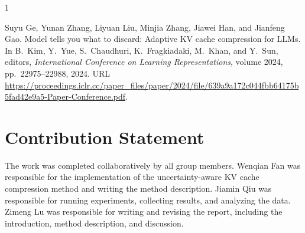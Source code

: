 \documentclass{article}
\begin{document}


\begin{thebibliography}{1}
\small

Suyu Ge, Yunan Zhang, Liyuan Liu, Minjia Zhang, Jiawei Han, and Jianfeng Gao.
\newblock Model tells you what to discard: Adaptive KV cache compression for LLMs.
\newblock In B.~Kim, Y.~Yue, S.~Chaudhuri, K.~Fragkiadaki, M.~Khan, and Y.~Sun, editors,
{\it International Conference on Learning Representations}, volume 2024,
pp.\ 22975--22988, 2024.
\newblock URL \url{https://proceedings.iclr.cc/paper_files/paper/2024/file/639a9a172c044fbb64175b5fad42e9a5-Paper-Conference.pdf}.

\end{thebibliography}

\appendix
  \section{Contribution Statement}

  The work was completed collaboratively by all group members. Wenqian Fan was responsible for the implementation of the uncertainty-aware KV cache compression method and writing the method description. Jiamin Qiu was responsible for running experiments, collecting results, and analyzing the data. Zimeng Lu was responsible for writing and revising the report, including the introduction, method description, and discussion.
\end{document}
